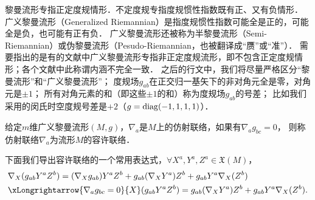 黎曼流形专指正定度规情形．不定度规专指度规惯性指数既有正、又有负情形．
广义黎曼流形（Generalized Riemannian）是指度规惯性指数可能全是正的，可能全是负，也可能有正有负．
广义黎曼流形还被称为半黎曼流形（Semi-Riemannian）或伪黎曼流形（Pesudo-Riemannian，也被翻译成“赝”或“准”）．
需要指出的是有的文献中广义黎曼流形专指非正定度规流形，即不包含正定度规情形；各个文献中此称谓内涵不完全一致．
之后的行文中，我们将尽量严格区分“黎曼流形”和“广义黎曼流形”；
度规场$g_{ab}$在正交归一基矢下的非对角元全是零，对角元是$\pm 1$；
所有对角元素的和（即这些$\pm 1$的和）称为度规场$g_{ab}$的{\heiti 号差}；
比如我们采用的闵氏时空度规号差是$+2$（$g={\rm diag}(-1,1,1,1)$）．

\begin{definition}
    给定$m$维广义黎曼流形$(M,g)$，$\nabla_a$是$M$上的仿射联络，如果有$\nabla_a g_{bc}=0$，
    则称仿射联络$\nabla_a$为流形$M$的{\heiti 容许联络}．
\end{definition}
下面我们导出容许联络的一个常用表达式，$\forall X^a,Y^a,Z^a\in \mathfrak{X}(M)$，
\begin{align}
    &\nabla_{X}(g_{ab}Y^a Z^b)= (\nabla_{X}g_{ab})Y^a Z^b  +g_{ab}( \nabla_{X}Y^a) Z^b
      +g_{ab}Y^a\nabla_{X}( Z^b)  \notag \\
    &\xLongrightarrow{\nabla_a g_{bc}=0}
    {X}(g_{ab}Y^a Z^b)= g_{ab}( \nabla_{X}Y^a) Z^b
    +g_{ab}Y^a\nabla_{X}( Z^b).  \label{chgd:eqn_connection-compatibility}
\end{align}


